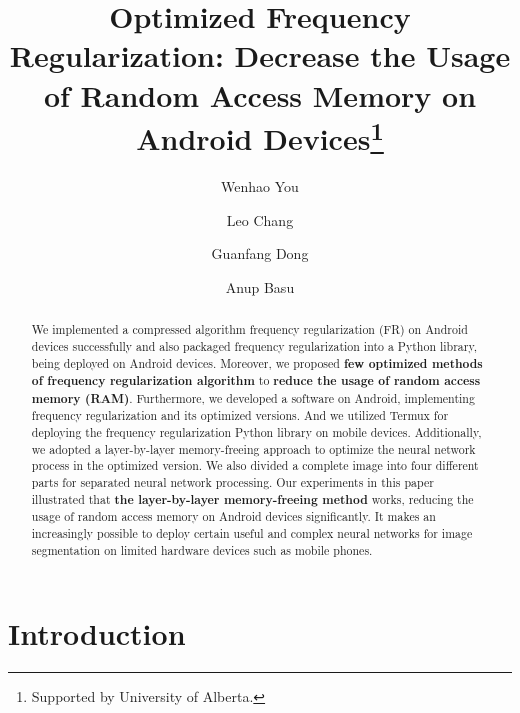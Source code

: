\documentclass[runningheads]{llncs}
\begin{document}
%
\title{Optimized Frequency Regularization: Decrease the Usage of Random Access Memory on Android Devices\thanks{Supported by University of Alberta.}}
%
%
\author{Wenhao You \and
Leo Chang \and
Guanfang Dong \and
Anup Basu}
%
%
%
\maketitle              %
%
\begin{abstract}
We implemented a compressed algorithm frequency regularization (FR) on Android devices successfully and also packaged frequency regularization into a Python library, being deployed on Android devices. Moreover, we proposed \textbf{few optimized methods of frequency regularization algorithm} to \textbf{reduce the usage of random access memory (RAM)}. Furthermore, we developed a software on Android, implementing frequency regularization and its optimized versions. And we utilized Termux for deploying the frequency regularization Python library on mobile devices. Additionally, we adopted a layer-by-layer memory-freeing approach to optimize the neural network process in the optimized version. We also divided a complete image into four different parts for separated neural network processing. Our experiments in this paper illustrated that \textbf{the layer-by-layer memory-freeing method} works, reducing the usage of random access memory on Android devices significantly. It makes an increasingly possible to deploy certain useful and complex neural networks for image segmentation on limited hardware devices such as mobile phones.

\end{abstract}
%
%
%
\section{Introduction}
\end{document}
